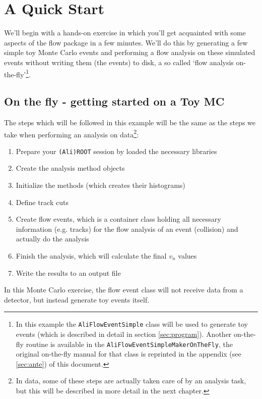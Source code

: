 \documentclass[a4paper]{book}
\numberwithin{equation}{subsection}
\begin{document}
\chapter{A Quick Start}\label{sec:onthefly}
We'll begin with a hands-on exercise in which you'll get acquainted with some aspects of the flow package in a few minutes. We'll do this by generating a few simple toy Monte Carlo events and performing a flow analysis on these simulated events without writing them (the events) to disk, a so called `flow analysis on-the-fly'\footnote{In this example the \texttt{AliFlowEventSimple} class will be used to generate toy events (which is described in detail in section \ref{sec:program}). Another on-the-fly routine is available in the \texttt{AliFlowEventSimpleMakerOnTheFly}, the original on-the-fly manual for that class is reprinted in the appendix (see \ref{sec:ante}) of this document.}. 
\section{On the fly - getting started on a Toy MC}
The steps which will be followed in this example will be the same as the steps we take when performing an analysis on data\footnote{In data, some of these steps are actually taken care of by an analysis task, but this will be described in more detail in the next chapter.}: 
\begin{enumerate}
\item Prepare your \texttt{(Ali)ROOT} session by loaded the necessary libraries
\item Create the analysis method objects
\item Initialize the methods (which creates their histograms)
\item Define track cuts
\item Create flow events, which is a container class holding all necessary information (e.g. tracks) for the flow analysis of an event (collision) and actually do the analysis
\item Finish the analysis, which will calculate the final $v_n$ values
\item Write the results to an output file
\end{enumerate}
In this Monte Carlo exercise, the flow event class will not receive data from a detector, but instead generate toy events itself. 
\end{document}
